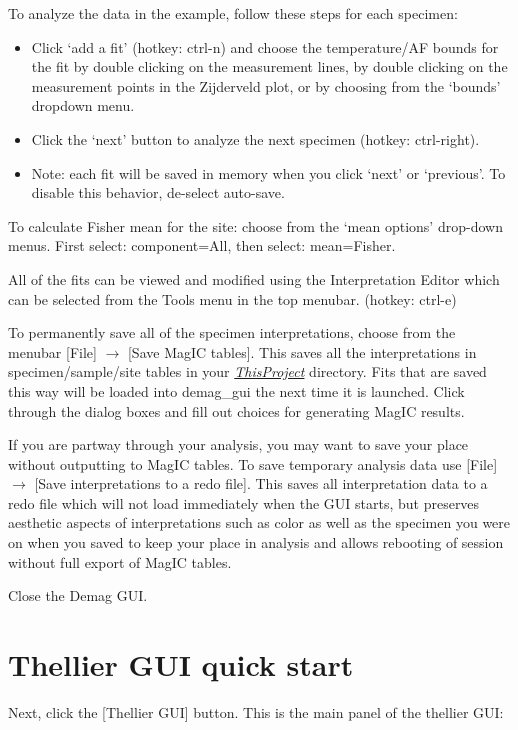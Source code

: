\documentclass[11pt]{book}
\begin{document}
{{To analyze the data in the example, follow these steps for each specimen:
\begin{itemize}
\item Click `add a fit' (hotkey: ctrl-n) and choose the temperature/AF bounds for the fit by double clicking on the measurement lines, by double clicking on the measurement points in the Zijderveld plot, or by choosing from the `bounds' dropdown menu.
\item Click the `next' button to analyze the next specimen (hotkey: ctrl-right).
\item Note: each fit will be saved in memory when you click `next' or `previous'.  To disable this behavior, de-select auto-save.
\end{itemize}

To calculate  Fisher mean for the site: choose from the `mean options' drop-down menus.  First select: component=All, then select: mean=Fisher.

All of the fits can be viewed and modified using the Interpretation Editor which can be selected from the Tools menu in the top menubar. (hotkey: ctrl-e)

To permanently save all of the specimen interpretations, choose from the menubar [File] $\rightarrow$ [Save MagIC  tables]. This saves all the interpretations in specimen/sample/site tables in your \href{#Project_Directory}{\it ThisProject} directory. Fits that are saved this way will be loaded into demag\_gui the next time it is launched.  Click through the dialog boxes and fill out choices for generating MagIC results.

If you are partway through your analysis, you may want to save your place without outputting to MagIC tables.  To save temporary analysis data use [File] $\rightarrow$ [Save interpretations to a redo file]. This saves all interpretation data to a redo file which will not load immediately when the GUI starts, but preserves aesthetic aspects of interpretations such as color as well as the specimen you were on when you saved to keep your place in analysis and allows rebooting of session without full export of MagIC tables.

Close the Demag GUI.



\section{Thellier GUI quick start}
Next, click the [Thellier GUI] button.  This is the main panel of the thellier GUI:

}}
\end{document}
